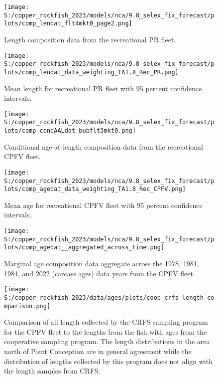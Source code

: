 \documentclass[11pt,
  english,
  letterpaper,
]{article}
\begin{document}
\pagebreak

\begin{figure}
\centering
\texttt{[image: S:/copper\_rockfish\_2023/models/nca/9.8\_selex\_fix\_forecast/plots/comp\_lendat\_flt4mkt0\_page2.png]}
\caption{Length composition data from the recreational PR fleet.\label{fig:rec-pr-len-data}}
\end{figure}

\pagebreak

\begin{figure}
\centering
\texttt{[image: S:/copper\_rockfish\_2023/models/nca/9.8\_selex\_fix\_forecast/plots/comp\_lendat\_data\_weighting\_TA1.8\_Rec\_PR.png]}
\caption{Mean length for recreational PR fleet with 95 percent confidence intervals.\label{fig:mean-rec-pr-len-data}}
\end{figure}

\FloatBarrier

\begin{figure}
\centering
\texttt{[image: S:/copper\_rockfish\_2023/models/nca/9.8\_selex\_fix\_forecast/plots/comp\_condAALdat\_bubflt3mkt0.png]}
\caption{Conditional age-at-length composition data from the recreational CPFV fleet.\label{fig:rec-cpfv-caal-data}}
\end{figure}

\pagebreak

\begin{figure}
\centering
\texttt{[image: S:/copper\_rockfish\_2023/models/nca/9.8\_selex\_fix\_forecast/plots/comp\_agedat\_data\_weighting\_TA1.8\_Rec\_CPFV.png]}
\caption{Mean age for recreational CPFV fleet with 95 percent confidence intervals.\label{fig:mean-rec-cpfv-age-data}}
\end{figure}

\FloatBarrier

\begin{figure}
\centering
\texttt{[image: S:/copper\_rockfish\_2023/models/nca/9.8\_selex\_fix\_forecast/plots/comp\_agedat\_\_aggregated\_across\_time.png]}
\caption{Marginal age composition data aggregate across the 1978, 1981, 1984, and 2022 (carcass ages) data years from the CPFV fleet.\label{fig:rec-cpfv-marg-age-data}}
\end{figure}

\pagebreak

\begin{figure}
\centering
\texttt{[image: S:/copper\_rockfish\_2023/data/ages/plots/coop\_crfs\_length\_comparison.png]}
\caption{Comparison of all length collected by the CRFS sampling program for the CPFV fleet to the lengths from the fish with ages from the cooperative sampling program. The length distributions in the area north of Point Conception are in general agreement while the distribution of lengths collected by this program does not align with the length samples from CRFS.\label{fig:coop-len-comparison}}
\end{figure}
\end{document}
